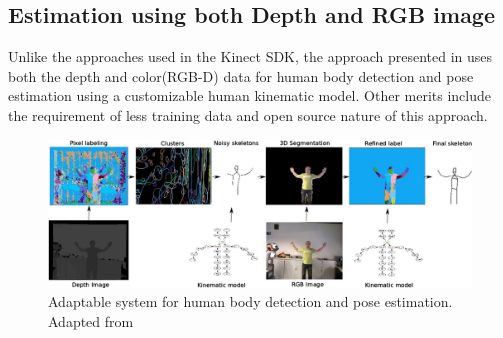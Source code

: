 \subsection{Estimation using both Depth and RGB image}
Unlike the approaches used in the Kinect SDK, the approach presented in \cite{Buys201439} uses both the depth and color(RGB-D) data for human body detection and pose estimation using a customizable human kinematic model. Other merits include the requirement of less training data and open source nature of this approach. 
\begin{figure}[H]
\centering
\includegraphics[width=\textwidth]{assets/adaptable_system_rgbd.png}
\caption[Adaptable system for human body detection and pose estimation]{Adaptable system for human body detection and pose estimation. {Adapted from \cite{Buys201439}}}
\label{fig:adaptable_rgbd}
\end{figure}


